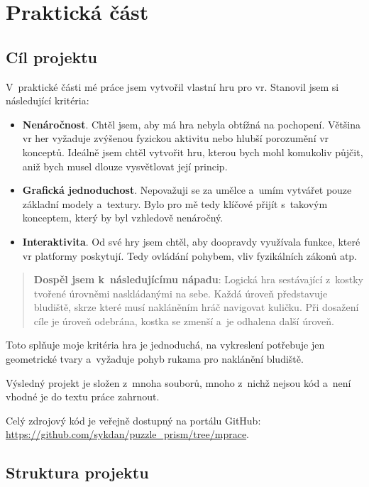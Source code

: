 \part{Praktická část}

\chapter{Cíl projektu}

V~praktické části mé práce jsem vytvořil vlastní hru pro \gls{vr}. Stanovil jsem si následující kritéria:

\begin{itemize}
  \item \textbf{Nenáročnost}. Chtěl jsem, aby má hra nebyla obtížná na pochopení. Většina \gls{vr} her vyžaduje zvýšenou fyzickou aktivitu nebo hlubší porozumění \gls{vr} konceptů. Ideálně jsem chtěl vytvořit hru, kterou bych mohl komukoliv půjčit, aniž bych musel dlouze vysvětlovat její princip.
  \item \textbf{Grafická jednoduchost}. Nepovažuji se za umělce a~umím vytvářet pouze základní modely a~textury. Bylo pro mě tedy klíčové přijít s~takovým konceptem, který by byl vzhledově nenáročný.
  \item \textbf{Interaktivita}. Od své hry jsem chtěl, aby doopravdy využívala funkce, které \gls{vr} platformy poskytují. Tedy ovládání pohybem, vliv fyzikálních zákonů atp.
\end{itemize}

\begin{quotation}
  \textbf{Dospěl jsem k~následujícímu nápadu}: Logická hra sestávající z~kostky tvořené úrovněmi naskládanými na sebe. Každá úroveň představuje bludiště, skrze které musí nakláněním hráč navigovat kuličku. Při dosažení cíle je úroveň odebrána, kostka se zmenší a~je odhalena další úroveň.
\end{quotation}

Toto splňuje moje kritéria \poml hra je jednoduchá, na vykreslení potřebuje jen geometrické tvary a~vyžaduje pohyb rukama pro naklánění bludiště.

Výsledný projekt je složen z~mnoha souborů, mnoho z~nichž nejsou kód a~není vhodné je do textu práce zahrnout. 

Celý zdrojový kód je veřejně dostupný na portálu GitHub: \url{https://github.com/sykdan/puzzle_prism/tree/mprace}.

\chapter{Struktura projektu}

